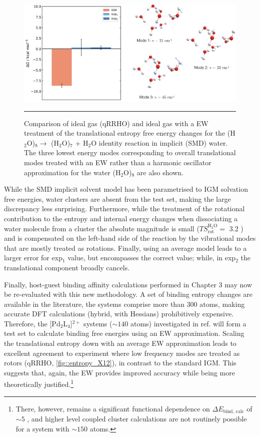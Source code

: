 \documentclass[../main.tex]{subfiles}
\begin{document}
\begin{figure}[h!]
	\centering
	\includegraphics[width=15cm]{4/figs/figX11/figX11}
	\vspace{0.2cm}
	\hrule
	\caption{Comparison of ideal gas (qRRHO) and ideal gas with a EW treatment of the translational entropy free energy changes for the (H$_2$O)$_8 \longrightarrow$ (H$_2$O)$_7$ +  H$_2$O identity reaction in implicit (SMD) water. The three lowest energy modes corresponding to overall translational modes treated with an EW rather than a harmonic oscillator approximation for the water (H$_2$O)$_8$ are also shown.} 
	\label{fig::entropy_X11}
\end{figure}

While the SMD implicit solvent model has been parametrised to IGM solvation free energies, water clusters are absent from the test set,\cite{Marenich2009} making the large discrepancy less surprising. Furthermore, while the treatment of the rotational contribution to the entropy and internal energy changes when dissociating a water molecule from a cluster the absolute magnitude is small ($TS_\text{rot}^{\text{H}{}_2\text{O}} =$ 3.2 \kcal) and is compensated on the left-hand side of the reaction by the vibrational modes that are mostly treated as rotations. Finally, using an average model leads to a larger error for exp$_1$ value, but encompasses the correct value; while, in exp$_2$ the translational component broadly cancels.

\newpage
Finally, host-guest binding affinity calculations performed in Chapter 3 may now be re-evaluated with this new methodology.  A set of binding entropy changes are available in the literature,\cite{Leung2008} the systems comprise more than 300 atoms, making accurate DFT calculations (hybrid, with Hessians) prohibitively expensive. Therefore, the [Pd$_2$L$_4$]${}^{2+}$ systems ($\sim140$ atoms) investigated in ref. \cite{Young2019} will form a test set to calculate binding free energies using an EW approximation. Scaling the translational entropy down with an average EW approximation leads to excellent agreement to experiment where low frequency modes are treated as rotors (qRRHO, \figurename{ \ref{fig::entropy_X12}}), in contrast to the standard IGM. This suggests that, again, the EW provides improved accuracy while being more theoretically justified.\footnote{There, however, remains a significant functional dependence on $\Delta E_\text{bind, calc}$ of $\sim 5$ \kcal, and higher level coupled cluster calculations are not routinely possible for a system with $\sim 150$ atoms.}
\end{document}
